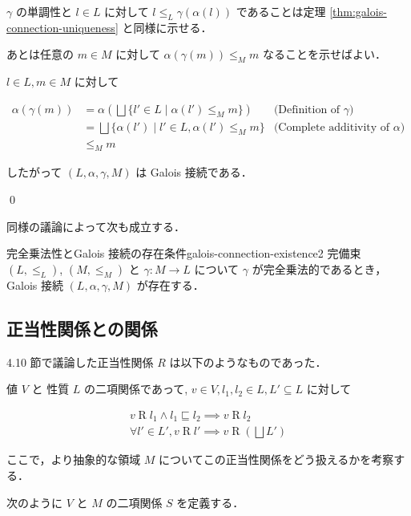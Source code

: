 \documentclass[uplatex]{jsarticle}
\begin{document}
$\gamma$ の単調性と $l \in L$ に対して $l \leq_L \gamma(\alpha(l))$ であることは定理 \ref{thm:galois-connection-uniqueness} と同様に示せる．

あとは任意の $m \in M$ に対して $\alpha(\gamma(m)) \leq_M m$ なることを示せばよい．

$l \in L, m \in M$ に対して

\begin{align*}
  \alpha(\gamma(m)) & = \alpha\left( \bigsqcup \{ l' \in L \mid \alpha(l') \leq_M m \} \right)
                    & \text{(Definition of $\gamma$)}                                          \\
                    & = \bigsqcup \{ \alpha(l') \mid l' \in L, \alpha(l') \leq_M m \}
                    & \text{(Complete additivity of $\alpha$)}                                 \\
                    & \leq_M m
\end{align*}


したがって $(L, \alpha, \gamma, M)$ は Galois 接続である．

\qed


同様の議論によって次も成立する．

\begin{boxtheorem}{完全乗法性とGalois 接続の存在条件}{galois-connection-existence2}
  完備束 $(L, \leq_L)$, $(M, \leq_M)$ と $\gamma: M \to L$ について
  $\gamma$ が完全乗法的であるとき， Galois 接続 $(L, \alpha, \gamma, M)$ が存在する．
\end{boxtheorem}

\subsection{正当性関係との関係}

4.10 節で議論した正当性関係 $R$ は以下のようなものであった．

値 $V$ と 性質 $L$ の二項関係であって, $v \in V, l_1, l_2 \in L, L' \subseteq L$ に対して

\begin{align}
  v \mathrel R l_1 \land l_1 \sqsubseteq l_2 \implies v \mathrel R l_2 \label{eq:validity-1} \\
  \forall l' \in L', v \mathrel R l' \implies v \mathrel R \left( \bigsqcup L' \right) \label{eq:validity-2}
\end{align}

ここで，より抽象的な領域 $M$ についてこの正当性関係をどう扱えるかを考察する．

次のように $V$ と $M$ の二項関係 $S$ を定義する．
\end{document}
